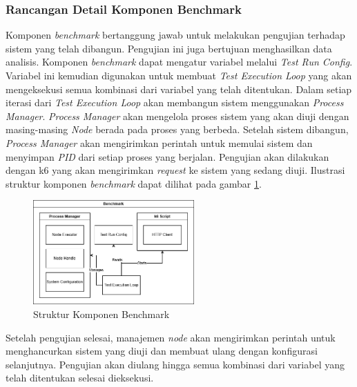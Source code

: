 \subsubsection{Rancangan Detail Komponen Benchmark}
\label{subsubsection:detail-data-benchmark}

Komponen \textit{benchmark} bertanggung jawab untuk melakukan pengujian terhadap sistem yang telah dibangun. Pengujian ini juga bertujuan menghasilkan data analisis. Komponen \textit{benchmark} dapat mengatur variabel melalui \textit{Test Run Config}. Variabel ini kemudian digunakan untuk membuat \textit{Test Execution Loop} yang akan mengeksekusi semua kombinasi dari variabel yang telah ditentukan. Dalam setiap iterasi dari \textit{Test Execution Loop} akan membangun sistem menggunakan \textit{Process Manager}. \textit{Process Manager} akan mengelola proses sistem yang akan diuji dengan masing-masing \textit{Node} berada pada proses yang berbeda. Setelah sistem dibangun, \textit{Process Manager} akan mengirimkan perintah untuk memulai sistem dan menyimpan \textit{PID} dari setiap proses yang berjalan. Pengujian akan dilakukan dengan k6 yang akan mengirimkan \textit{request} ke sistem yang sedang diuji. Ilustrasi struktur komponen \textit{benchmark} dapat dilihat pada gambar \ref{fig:benchmark-structure}.

\begin{figure}[ht]
    \centering
    \includegraphics[width=0.55\textwidth]{resources/chapter-3/benchmark-architecture.png}
    \caption{Struktur Komponen Benchmark}
    \label{fig:benchmark-structure}
\end{figure}

Setelah pengujian selesai, manajemen \textit{node} akan mengirimkan perintah untuk menghancurkan sistem yang diuji dan membuat ulang dengan konfigurasi selanjutnya. Pengujian akan diulang hingga semua kombinasi dari variabel yang telah ditentukan selesai dieksekusi.